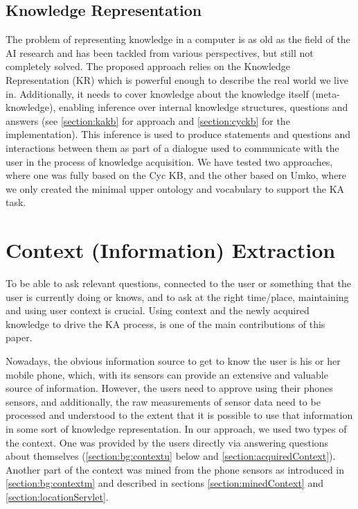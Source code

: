 \subsection{Knowledge Representation}
\label{section:bg:representation}
The problem of representing knowledge in a computer is as old as the field of 
the AI research and has been tackled from various perspectives, but still not 
completely solved. The proposed approach relies on the Knowledge Representation
(KR) which is powerful 
enough to describe the real world we live in. Additionally, it needs to cover 
knowledge about the knowledge itself (meta-knowledge), enabling inference over 
internal knowledge structures, questions and answers (see \autoref{section:kakb}
for approach and \autoref{section:cyckb} for the implementation). 
This inference is used to 
produce statements and questions and interactions between them as part of a 
dialogue used to communicate with the user in the process of knowledge 
acquisition. We have tested two approaches, where one was fully based on 
the Cyc KB, and the other based on Umko, where we only created the 
minimal upper ontology and vocabulary to support the KA task. 

\section{Context (Information) Extraction}
\label{section:bg:context}
To be able to ask relevant questions, connected to the user or something that 
the user is currently doing or knows, and to ask at the right time/place, 
maintaining and using user context is crucial. Using context and the newly 
acquired knowledge to drive the KA process, is one of the main contributions 
of this paper. 

Nowadays, the obvious information source to get to know the user is his or her
mobile phone, which, with its sensors can provide an extensive and valuable 
source of information. However, the users need to approve using their phones 
sensors, and additionally, the raw measurements of sensor data need to be 
processed and understood to the extent that it is possible to use that 
information in some sort of knowledge representation. In our approach, we used 
two types of the context. One was provided by the users directly via answering 
questions about themselves (\autoref{section:bg:contextu} below and 
\autoref{section:acquiredContext}). Another part 
of the context was mined from the phone sensors as introduced in 
\autoref{section:bg:contextm} and described in sections 
\ref{section:minedContext} and \ref{section:locationServlet}.

